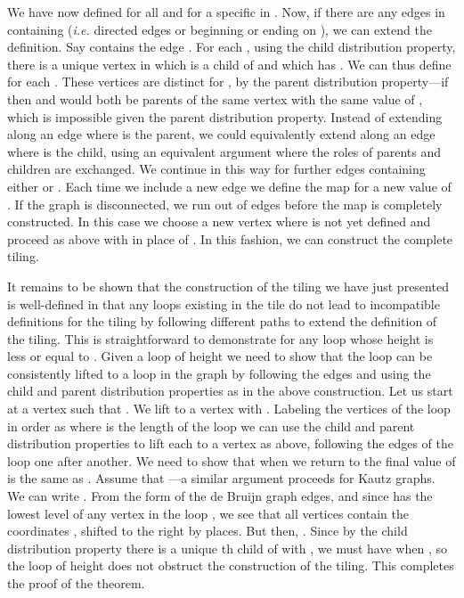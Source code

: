 \documentclass[12pt]{article}
\begin{document}
We have now defined  for all  and for a specific 
in .
Now, if
there are any edges in  containing  ({\it i.e.} directed edges
 or  beginning or
ending on ), we can extend the
definition.  Say  contains the edge .  For each , using the child distribution property, there is a unique vertex
 in  which is a child of  and which has .  We can thus define  for each .  These
vertices  are distinct for , by the parent
distribution property---if  then  and
 would both be parents of the same vertex with the same
value of , which is impossible given the parent distribution
property.  Instead of extending along an edge where  is the
parent, we could equivalently extend along an edge where  is the
child, using an equivalent argument where the roles of parents and
children are exchanged.  We continue in this way for further edges
containing either  or .  Each time we include a new edge we
define the map  for a new value of .  If the graph  is
disconnected, we run out of edges before the map  is completely
constructed.  In this case we choose a new vertex  where  is
not yet defined and proceed as above with  in place of .
In this fashion, we can construct the complete tiling.

It remains to be shown that the construction of the tiling we have
just presented is well-defined in that any loops existing in the tile
do not lead to incompatible definitions for the tiling by following
different paths to extend the definition of the tiling.
This is straightforward to demonstrate for any loop whose height is
less or equal to . Given a loop  of height 
we need to show that
the loop can be consistently lifted to a loop in the graph  by
following the edges and using the child and parent distribution
properties as in the above construction.  Let us start at a vertex
 such that .
We lift  to a vertex  with
.  Labeling the vertices of the loop in order as
 where  is the length of the
loop we can use the 
child and parent distribution properties to lift each  to a
vertex  as above, following the edges of the loop one after
another.  We need to show that when we return to  the final value
of  is the same as .  Assume that ---a
similar argument proceeds for Kautz graphs.  We can write
.  From the form of the de Bruijn graph edges,
and since  has the lowest level of any vertex in the loop , we
see that all vertices  contain the coordinates , shifted to the right by  places.
But then, .  Since by the child distribution property
there is a unique th child of 
with , we must have  when , so
the loop of height  does not obstruct the construction of
the tiling.  This completes the proof of the theorem.
\vspace*{0.1in}
\end{document}
